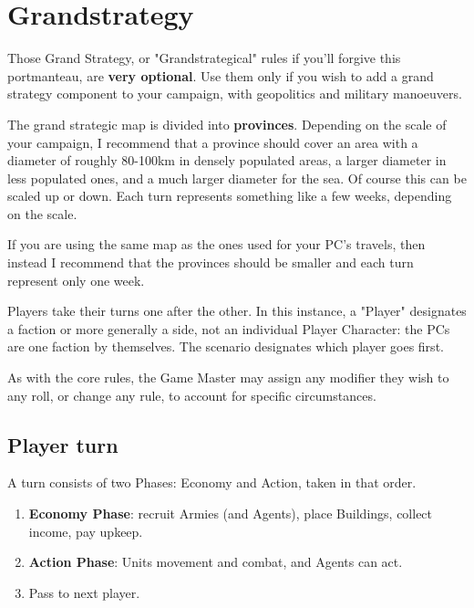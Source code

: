 \chapter{Grandstrategy}

Those Grand Strategy, or "Grandstrategical" rules if you'll forgive this portmanteau, are \textbf{very optional}. Use them only if you wish to add a grand strategy component to your campaign, with geopolitics and military manoeuvers.

\label{strategy_rules}

The grand strategic map is divided into \textbf{provinces}. Depending on the scale of your campaign, I recommend that a province should cover an area with a diameter of roughly 80-100km in densely populated areas, a larger diameter in less populated ones, and a much larger diameter for the sea. Of course this can be scaled up or down. Each turn represents something like a few weeks, depending on the scale.

If you are using the same map as the ones used for your PC's travels, then instead I recommend that the provinces should be smaller and each turn represent only one week.

Players take their turns one after the other. In this instance, a "Player" designates a faction or more generally a side, not an individual Player Character: the PCs are one faction by themselves. The scenario designates which player goes first.

\begin{rpg-examplebox}
	As with the core rules, the Game Master may assign any modifier they wish to any roll, or change any rule, to account for specific circumstances.
\end{rpg-examplebox}


\section{Player turn}

A turn consists of two Phases: Economy and Action, taken in that order.

\begin{enumerate}
    \item \textbf{Economy Phase}: recruit Armies (and Agents), place Buildings, collect income, pay upkeep.
    \item \textbf{Action Phase}: Units movement and combat, and Agents can act.
    \item Pass to next player.
\end{enumerate}

